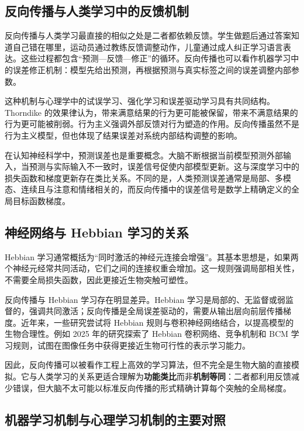 \documentclass[UTF8,zihao=5,a4paper]{ctexart}
\begin{document}
\subsection{反向传播与人类学习中的反馈机制}

反向传播与人类学习最直接的相似之处是二者都依赖反馈。学生做题后通过答案知道自己错在哪里，运动员通过教练反馈调整动作，儿童通过成人纠正学习语言表达。这些过程都包含“预测—反馈—修正”的循环。反向传播也可以看作机器学习中的误差修正机制：模型先给出预测，再根据预测与真实标签之间的误差调整内部参数。

这种机制与心理学中的试误学习、强化学习和误差驱动学习具有共同结构。Thorndike 的效果律认为，带来满意结果的行为更可能被保留，带来不满意结果的行为更可能被削弱。行为主义强调外部反馈对行为塑造的作用。反向传播虽然不是行为主义模型，但也体现了结果误差对系统内部结构调整的影响。

在认知神经科学中，预测误差也是重要概念。大脑不断根据当前模型预测外部输入，当预测与实际输入不一致时，误差信号促使内部模型更新。这与深度学习中的损失函数和梯度更新存在类比关系。不同的是，人类预测误差通常是局部、多模态、连续且与注意和情绪相关的，而反向传播中的误差信号是数学上精确定义的全局目标函数梯度。

\subsection{神经网络与 Hebbian 学习的关系}

Hebbian 学习通常概括为“同时激活的神经元连接会增强”。其基本思想是，如果两个神经元经常共同活动，它们之间的连接权重会增加\cite{hebb1949organization}。这一规则强调局部相关性，不需要全局损失函数，因此更接近生物突触可塑性。

反向传播与 Hebbian 学习存在明显差异。Hebbian 学习是局部的、无监督或弱监督的，强调共同激活；反向传播是全局误差驱动的，需要从输出层向前层传播梯度。近年来，一些研究尝试将 Hebbian 规则与卷积神经网络结合，以提高模型的生物合理性。例如 2025 年的研究探索了 Hebbian 卷积网络、竞争机制和 BCM 学习规则，试图在图像任务中获得更接近生物可行性的表示学习能力\cite{nimmo2025hebbian}。

因此，反向传播可以被看作工程上高效的学习算法，但不完全是生物大脑的直接模拟。它与人类学习的关系更适合理解为\textbf{功能类比}而非\textbf{机制等同}：二者都利用反馈减少错误，但大脑不太可能以标准反向传播的形式精确计算每个突触的全局梯度。

\subsection{机器学习机制与心理学习机制的主要对照}
\end{document}
